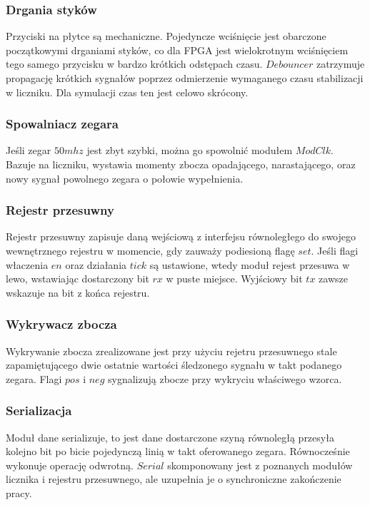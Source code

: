 \documentclass[a4paper,12pt]{article}
\begin{document}
\subsubsection{Drgania styków}
Przyciski na płytce są mechaniczne. Pojedyncze wciśnięcie jest obarczone początkowymi drganiami styków, co dla FPGA jest wielokrotnym wciśnięciem tego samego przycisku w bardzo krótkich odstępach czasu. $Debouncer$ zatrzymuje propagację krótkich sygnałów poprzez odmierzenie wymaganego czasu stabilizacji w liczniku. Dla symulacji czas ten jest celowo skrócony.


\subsubsection{Spowalniacz zegara}
Jeśli zegar $50mhz$ jest zbyt szybki, można go spowolnić modułem $ModClk$. Bazuje na liczniku, wystawia momenty zbocza opadającego, narastającego, oraz nowy sygnał powolnego zegara o połowie wypełnienia.


\subsubsection{Rejestr przesuwny}
Rejestr przesuwny zapisuje daną wejściową z interfejsu równoległego do swojego wewnętrznego rejestru w momencie, gdy zauważy podiesioną flagę $set$. Jeśli flagi właczenia $en$ oraz działania $tick$ są ustawione, wtedy moduł rejest przesuwa w lewo, wstawiając dostarczony bit $rx$ w puste miejsce. Wyjściowy bit $tx$ zawsze wskazuje na bit z końca rejestru.


\subsubsection{Wykrywacz zbocza}
Wykrywanie zbocza zrealizowane jest przy użyciu rejetru przesuwnego stale zapamiętującego dwie ostatnie wartości śledzonego sygnału w takt podanego zegara. Flagi $pos$ i $neg$ sygnalizują zbocze przy wykryciu właściwego wzorca.


\subsubsection{Serializacja}
Moduł dane serializuje, to jest dane dostarczone szyną równoległą przesyła kolejno bit po bicie pojedynczą linią w takt oferowanego zegara. Równocześnie wykonuje operację odwrotną. $Serial$ skomponowany jest z poznanych modułów licznika i rejestru przesuwnego, ale uzupełnia je o synchroniczne zakończenie pracy.

\end{document}
